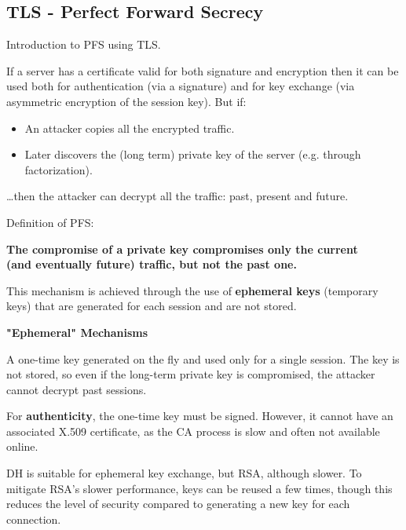 \subsection{TLS - Perfect Forward Secrecy}
\begin{center}
    Introduction to PFS using TLS.
\end{center}
If a server has a certificate valid for both signature and encryption then it can be used both for authentication (via a signature) and for key exchange (via asymmetric encryption of the session key). But if:
\begin{itemize}
    \item An attacker copies all the encrypted traffic.
    \item Later discovers the (long term) private key of the server (e.g. through factorization).
\end{itemize}
\dots then the attacker can decrypt all the traffic: past, present and future.
\begin{center}
    Definition of PFS:

    \vspace{0.2cm}

    \textbf{The compromise of a private key compromises only the current \\ (and eventually future) traffic, but not the past one.}
\end{center}

\vspace{0.3cm}

This mechanism is achieved through the use of \textbf{ephemeral keys} (temporary keys) that are generated for each session and are not stored.

\begin{center}
    \large{\textbf{"Ephemeral" Mechanisms}}
\end{center}

A one-time key generated on the fly and used only for a single session. The key is not stored, so even if the long-term private key is compromised, the attacker cannot decrypt past sessions.

\vspace{0.2cm}

For \textbf{authenticity}, the one-time key must be signed. However, it cannot have an associated X.509 certificate, as the CA process is slow and often not available online.

\vspace{0.2cm}

DH is suitable for ephemeral key exchange, but RSA, although slower. To mitigate RSA’s slower performance, keys can be reused a few times, though this reduces the level of security compared to generating a new key for each connection.

